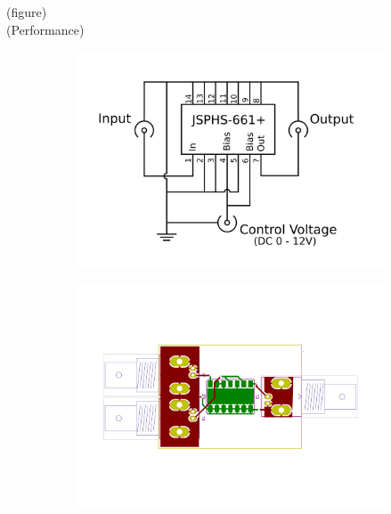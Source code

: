 (figure)\\
(Performance)


\begin{figure}
	\centering
	\begin{subfigure}{.5\textwidth}
		\centering
		\includegraphics[height=0.2\textheight]{Chapters/Deflection/circuit_phase}
		\caption{}
		\label{fig:circuit_phase}
	\end{subfigure}%
	\begin{subfigure}{.5\textwidth}
		\centering
		\includegraphics[height=0.2\textheight]{Chapters/Deflection/PCB_phase}
		\caption{}
		\label{fig:PCB_phase}
	\end{subfigure}
	\caption{}
	\label{fig:PhaseShifter}
\end{figure}



